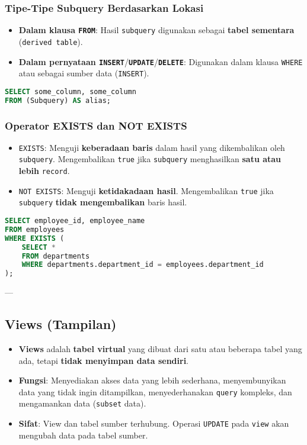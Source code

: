 \documentclass{article}
\begin{document}
\subsubsection{Tipe-Tipe Subquery Berdasarkan Lokasi}
\begin{itemize}
    \item \textbf{Dalam klausa \texttt{FROM}}: Hasil \texttt{subquery} digunakan sebagai \textbf{tabel sementara} (\texttt{derived table}).
    \item \textbf{Dalam pernyataan \texttt{INSERT}}/\textbf{\texttt{UPDATE}}/\textbf{\texttt{DELETE}}: Digunakan dalam klausa \texttt{WHERE} atau sebagai sumber data (\texttt{INSERT}).
\end{itemize}
\begin{lstlisting}[language=SQL, caption={Subquery dalam Klausa FROM}, captionpos=b]
SELECT some_column, some_column 
FROM (Subquery) AS alias;
\end{lstlisting}

\subsubsection{Operator EXISTS dan NOT EXISTS}
\begin{itemize}
    \item \texttt{EXISTS}: Menguji \textbf{keberadaan baris} dalam hasil yang dikembalikan oleh \texttt{subquery}. Mengembalikan \texttt{true} jika \texttt{subquery} menghasilkan \textbf{satu atau lebih} \texttt{record}.
    \item \texttt{NOT EXISTS}: Menguji \textbf{ketidakadaan hasil}. Mengembalikan \texttt{true} jika \texttt{subquery} \textbf{tidak mengembalikan} baris hasil.
\end{itemize}
\begin{lstlisting}[language=SQL, caption={Contoh EXISTS}, captionpos=b]
SELECT employee_id, employee_name
FROM employees
WHERE EXISTS (
    SELECT *
    FROM departments
    WHERE departments.department_id = employees.department_id
);
\end{lstlisting}

---

\subsection{Views (Tampilan)}
\begin{itemize}
    \item \textbf{Views} adalah \textbf{tabel virtual} yang dibuat dari satu atau beberapa tabel yang ada, tetapi \textbf{tidak menyimpan data sendiri}.
    \item \textbf{Fungsi}: Menyediakan akses data yang lebih sederhana, menyembunyikan data yang tidak ingin ditampilkan, menyederhanakan \texttt{query} kompleks, dan mengamankan data (\texttt{subset} data).
    \item \textbf{Sifat}: View dan tabel sumber terhubung. Operasi \texttt{UPDATE} pada \texttt{view} akan mengubah data pada tabel sumber.
\end{itemize}
\end{document}

